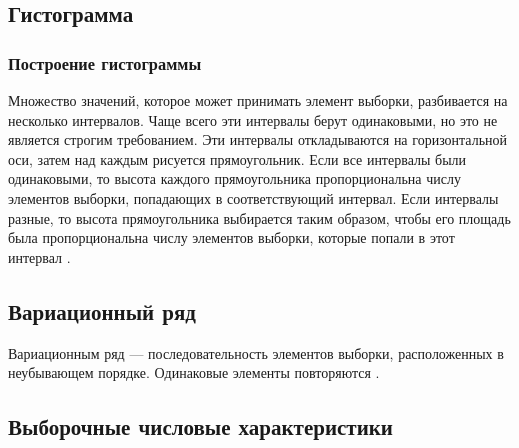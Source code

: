 \documentclass[12pt]{article}
\begin{document}
\subsection{Гистограмма}
\subsubsection{Построение гистограммы}
Множество значений, которое может принимать элемент выборки, разбивается на несколько интервалов. Чаще всего эти интервалы берут одинаковыми, но это не является строгим требованием. Эти интервалы откладываются на горизонтальной оси, затем над каждым рисуется прямоугольник. Если
все интервалы были одинаковыми, то высота каждого прямоугольника пропорциональна числу элементов выборки, попадающих в соответствующий интервал. Если интервалы разные, то высота прямоугольника выбирается таким образом, чтобы его площадь была пропорциональна числу элементов
выборки, которые попали в этот интервал \cite{histogram}.
\subsection{Вариационный ряд}
Вариационным ряд — последовательность элементов выборки, расположенных в неубывающем порядке. Одинаковые элементы повторяются \cite{theory}.
\subsection{Выборочные числовые характеристики}
\end{document}

